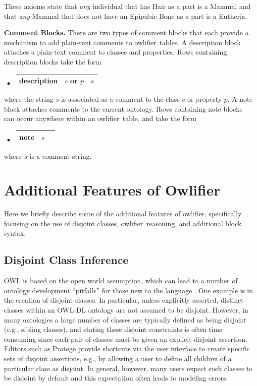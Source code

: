 \documentclass[5p,authoryear]{elsarticle}
\newcommand{\Owlifier}{\textsf{Owlifier}}
\newcommand{\owlifier}{\textsf{owlifier}}
\newcommand{\myblock}[1]{\vspace{12pt}\noindent\textbf{#1}}
\begin{document}
These axioms state that \emph{any} individual that has Hair as a part
is a Mammal and that \emph{any} Mammal that does not have an Epipubic
Bone as a part is a Eutheria.

\myblock{Comment Blocks.} There are two types of comment blocks that
each provide a mechanism to add plain-text comments to
\owlifier\ tables. A description block attaches a plain-text comment
to classes and properties. Rows containing description blocks take the
form
\begin{itemize}
\item[]
  \begin{tabular}{|l|l|l|}\hline \textsf{description} & $c$ or $p$ & $s$
    \\ \hline
  \end{tabular}
\end{itemize}
where the string $s$ is associated as a comment to the class $c$ or
property $p$. A note block attaches comments to the current
ontology. Rows containing note blocks can occur anywhere within an
\owlifier\ table, and take the form
\begin{itemize}
\item[]
  \begin{tabular}{|l|l|l|}\hline \textsf{note} & $s$
\\ \hline
  \end{tabular}
\end{itemize}
where $s$ is a comment string. 


\section{Additional Features of \Owlifier}
\label{sec:features}

Here we briefly describe some of the additional features of \owlifier,
specifically focusing on the use of disjoint classes,
\owlifier\ reasoning, and additional block syntax.
 
\subsection{Disjoint Class Inference}

OWL is based on the open world assumption, which can lead to a number
of ontology development ``pitfalls'' for those new to the language
\citep{smith04:_owl_web_ontol_languag_guide,rector04:_owl_pizzas}. One
example is in the creation of disjoint classes.  In particular, unless
explicitly asserted, distinct classes within an OWL-DL ontology are
not assumed to be disjoint. However, in many ontologies a large number
of classes are typically defined as being disjoint (e.g., sibling
classes), and stating these disjoint constraints is often time
consuming since each pair of classes must be given an explicit
disjoint assertion. Editors such as Protege
\citep{knublauch04:_editin_descr_logic_ontol_with} provide shortcuts
via the user interface to create specific sets of disjoint assertions,
e.g., by allowing a user to define all children of a particular class
as disjoint. In general, however, many users expect such classes to be
disjoint by default \citep{rector04:_owl_pizzas} and this expectation
often leads to modeling errors.
\end{document}
